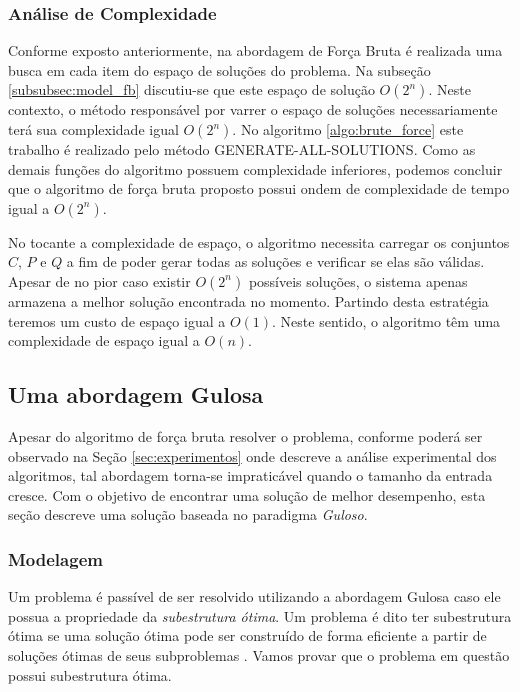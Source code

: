 \documentclass[12pt]{article}
\begin{document}
\subsubsection{Análise de Complexidade}
\label{subsubsec:fb_analise_complexidade}

Conforme exposto anteriormente, na abordagem de Força Bruta é realizada uma busca em cada item do espaço de soluções do problema. Na subseção \ref{subsubsec:model_fb} discutiu-se que este espaço de solução $O(2^{n})$. Neste contexto, o método responsável por varrer o espaço de soluções necessariamente terá sua complexidade igual $O(2^{n})$. No algoritmo \ref{algo:brute_force} este trabalho é realizado pelo método \textsc{GENERATE-ALL-SOLUTIONS}{}. Como as demais funções do algoritmo possuem complexidade inferiores, podemos concluir que o algoritmo de força bruta proposto possui ondem de complexidade de tempo igual a $O(2^{n})$.

No tocante a complexidade de espaço, o algoritmo necessita carregar os conjuntos $C$, $P$ e $Q$ a fim de poder gerar todas as soluções e verificar se elas são válidas. Apesar de no pior caso existir $O(2^{n})$ possíveis soluções, o sistema apenas armazena a melhor solução encontrada no momento. Partindo desta estratégia teremos um custo de espaço igual a $O(1)$. Neste sentido, o algoritmo têm uma complexidade de espaço igual a $O(n)${}.

\subsection{Uma abordagem Gulosa}
\label{subsec:guloso}

Apesar do algoritmo de força bruta resolver o problema, conforme poderá ser observado na Seção \ref{sec:experimentos} onde descreve a análise experimental dos algoritmos, tal abordagem torna-se impraticável quando o tamanho da entrada cresce. Com o objetivo de encontrar uma solução de melhor desempenho, esta seção descreve uma solução baseada no paradigma \textit{Guloso}.

\subsubsection{Modelagem}
\label{subsubsec:model_guloso}
Um problema é passível de ser resolvido utilizando a abordagem Gulosa caso ele possua a propriedade da \textit{subestrutura ótima}{}. Um problema é dito ter subestrutura ótima se uma solução ótima pode ser construído de forma eficiente a partir de soluções ótimas de seus subproblemas \cite{Cormen:2009:IAT:1614191}{}. Vamos provar que o problema em  questão possui subestrutura ótima.
\end{document}
